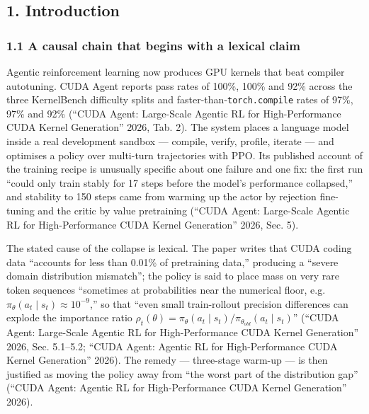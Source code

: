 \documentclass[
  11pt,
]{article}
\begin{document}
\hypertarget{introduction}{%
\subsection{1. Introduction}\label{introduction}}

\hypertarget{a-causal-chain-that-begins-with-a-lexical-claim}{%
\subsubsection{1.1 A causal chain that begins with a lexical
claim}\label{a-causal-chain-that-begins-with-a-lexical-claim}}

Agentic reinforcement learning now produces GPU kernels that beat
compiler autotuning. CUDA Agent reports pass rates of 100\%, 100\% and
92\% across the three KernelBench difficulty splits and
faster-than-\texttt{torch.compile} rates of 97\%, 97\% and 92\%
({``{CUDA Agent}: Large-Scale Agentic {RL} for High-Performance {CUDA}
Kernel Generation''} 2026, Tab. 2). The system places a language model
inside a real development sandbox --- compile, verify, profile, iterate
--- and optimises a policy over multi-turn trajectories with PPO. Its
published account of the training recipe is unusually specific about one
failure and one fix: the first run ``could only train stably for 17
steps before the model's performance collapsed,'' and stability to 150
steps came from warming up the actor by rejection fine-tuning and the
critic by value pretraining ({``{CUDA Agent}: Large-Scale Agentic {RL}
for High-Performance {CUDA} Kernel Generation''} 2026, Sec. 5).

The stated cause of the collapse is lexical. The paper writes that CUDA
coding data ``accounts for less than 0.01\% of pretraining data,''
producing a ``severe domain distribution mismatch''; the policy is said
to place mass on very rare token sequences ``sometimes at probabilities
near the numerical floor,
e.g.~\(\pi_\theta(a_t \mid s_t) \approx 10^{-9}\),'' so that ``even
small train-rollout precision differences can explode the importance
ratio
\(\rho_t(\theta) = \pi_\theta(a_t \mid s_t) / \pi_{\theta_{old}}(a_t \mid s_t)\)''
({``{CUDA Agent}: Large-Scale Agentic {RL} for High-Performance {CUDA}
Kernel Generation''} 2026, Sec. 5.1--5.2; {``{CUDA Agent}: Agentic {RL}
for High-Performance {CUDA} Kernel Generation''} 2026). The remedy ---
three-stage warm-up --- is then justified as moving the policy away from
``the worst part of the distribution gap'' ({``{CUDA Agent}: Agentic
{RL} for High-Performance {CUDA} Kernel Generation''} 2026).
\end{document}
